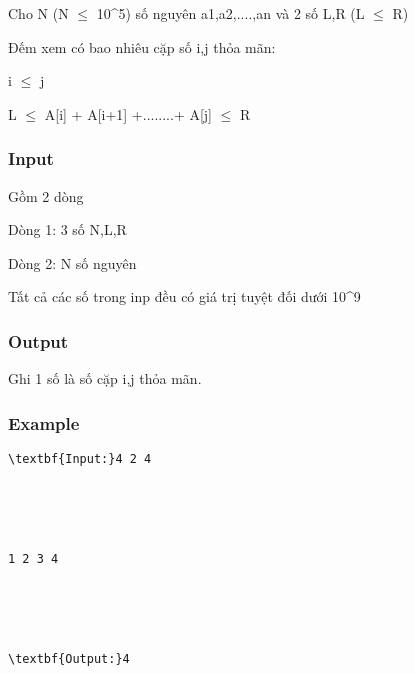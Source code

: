 



    Cho N (N $\le$ 10^5) số nguyên a1,a2,....,an và 2 số L,R (L $\le$ R)    






    Đếm xem có bao nhiêu cặp số i,j thỏa mãn:   



    i  $\le$  j   



    L $\le$  A[i] + A[i+1] +........+ A[j]  $\le$ R   

\subsubsection{   Input  }

    Gồm 2 dòng   

    Dòng 1: 3 số N,L,R   

    Dòng 2: N số nguyên   

    Tất cả các số trong inp đều có giá trị tuyệt đối dưới 10^9    




\subsubsection{   Output  }

    Ghi 1 số là số cặp i,j thỏa mãn.   

\subsubsection{   Example  }
\begin{verbatim}
\textbf{Input:}4 2 4





1 2 3 4





\textbf{Output:}4\end{verbatim}

